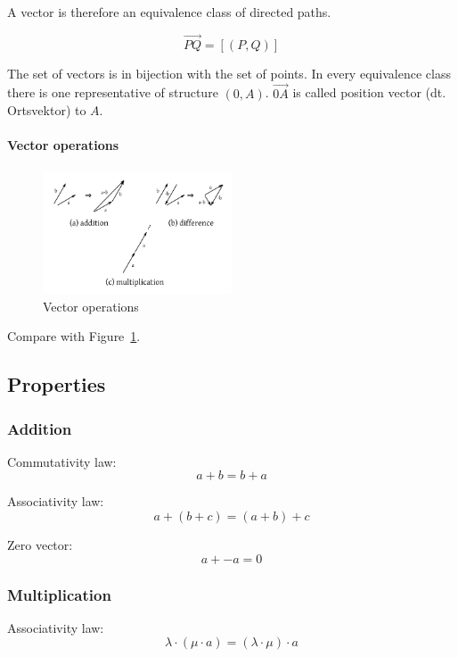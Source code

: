 \documentclass[a4paper,landscape,twocolumn]{article}
\begin{document}
A vector is therefore an equivalence class of directed paths.

\[ \overrightarrow{PQ} = [(P, Q)] \]

The set of vectors is in bijection with the set of points.
In every equivalence class there is one representative of structure $(0, A)$.
$\overrightarrow{0A}$ is called position vector (dt. Ortsvektor) to $A$.

\paragraph{Vector operations}
\begin{figure}[!h]
  \begin{center}
    \includegraphics[width=0.5\textwidth]{img/vector_operations.pdf}
    \caption{Vector operations}
    \label{img:vector-operations}
  \end{center}
\end{figure}

Compare with Figure~\ref{img:vector-operations}.

\subsection{Properties}

\subsubsection{Addition}

Commutativity law:
\[ a + b = b + a \]

Associativity law:
\[ a + (b + c) = (a + b) + c \]

Zero vector:
\[ a + -a = 0 \]

\subsubsection{Multiplication}

Associativity law:
\[ \lambda \cdot (\mu \cdot a) = (\lambda \cdot \mu) \cdot a \]
\end{document}
